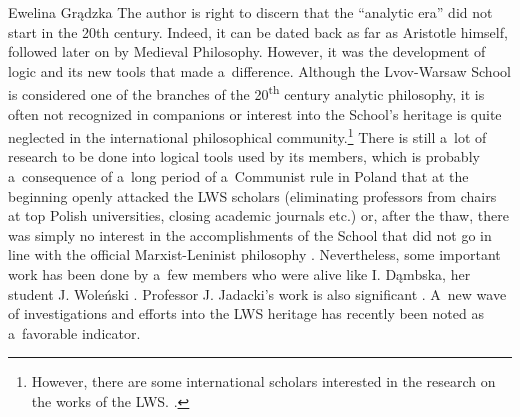 \begin{newrevengenv}{Ewelina Grądzka}
The author is right to discern that the ``analytic era'' did not start in the 20th century. Indeed, it can be dated back as far as Aristotle himself, followed later on by Medieval Philosophy. However, it was the development of logic and its new tools that made a~difference. Although the Lvov-Warsaw School is considered one of the branches of the 20\textsuperscript{th} century analytic philosophy, it is often not recognized in companions
\parencites[cf.][]{beaney_oxford_2015}[][]{dainton_bloomsbury_2015}[][]{martinich_companion_2006} %
 or interest into the School's heritage is quite neglected in the international philosophical community.\footnote{However, there are some international scholars interested in the research on the works of the LWS. 
\parencites[cf.][]{brandl_actions_1999}[][]{poli_polish_1993}[][]{schaar_kazimierz_2016}[][]{simons_philosophy_1992}.%
} There is still a~lot of research to be done into logical tools used by its members, which is probably a~consequence of a~long period of a~Communist rule in Poland that at the beginning openly attacked the LWS scholars (eliminating professors from chairs at top Polish universities, closing academic journals etc.) or, after the thaw, there was simply no interest in the accomplishments of the School that did not go in line with the official Marxist-Leninist philosophy 
\parencites[cf.][]{kuliniak_filozofia_2018}[][]{kuliniak_filozofia_2019}. %
 Nevertheless, some important work has been done by a~few members who were alive like I. Dąmbska, her student J. Woleński 
\parencites*{wolenski_filozoficzna_1985}{wolenski_filozofia_1986}[][]{wolenski_logic_1989}. %
 Professor J. Jadacki's work is also significant 
\parencites[][]{jadacki_semiotyka_1987}[][]{jadacki_semiotyka_1989}. %
 A~new wave of investigations and efforts into the LWS heritage has recently been noted as a~favorable indicator.


\end{newrevengenv}
